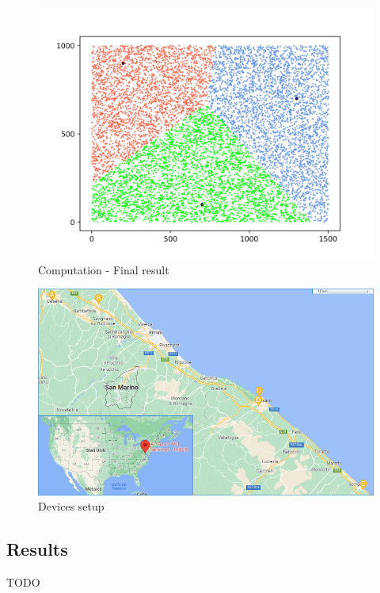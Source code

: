 \begin{figure}[!ht]
    \centering
    \includegraphics[width=\linewidth]{document/chapters/chapter_7/images/computation_final_result.png}
    \caption{Computation - Final result}
    \label{fig:computation_final_result}
\end{figure}

\begin{figure}[!ht]
    \centering
    \includegraphics[width=\linewidth]{document/chapters/chapter_7/images/experiment_devices_setup.png}
    \caption{Devices setup}
    \label{fig:experiment_devices_setup}
\end{figure}

\subsection{Results}
TODO

